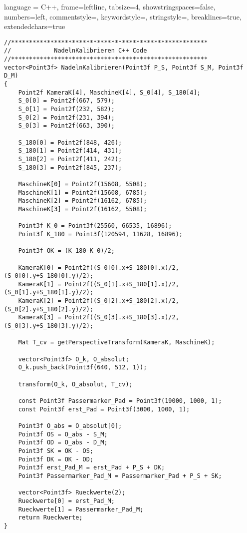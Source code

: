 \lstset
{
    language = C++,
    frame=leftline, %
    tabsize=4, %
    showstringspaces=false, %
    numbers=left, %
    commentstyle=\color{gray}, %
    keywordstyle=\color{red}, %
    stringstyle=\color{blue}, %
    breaklines=true,
    extendedchars=true
}
\begin{lstlisting}
//*******************************************************
//            NadelnKalibrieren C++ Code
//*******************************************************
vector<Point3f> NadelnKalibrieren(Point3f P_S, Point3f S_M, Point3f D_M)
{
    Point2f KameraK[4], MaschineK[4], S_0[4], S_180[4];
    S_0[0] = Point2f(667, 579);
    S_0[1] = Point2f(232, 582);
    S_0[2] = Point2f(231, 394);
    S_0[3] = Point2f(663, 390);

    S_180[0] = Point2f(848, 426);
    S_180[1] = Point2f(414, 431);
    S_180[2] = Point2f(411, 242);
    S_180[3] = Point2f(845, 237);

    MaschineK[0] = Point2f(15608, 5508);
    MaschineK[1] = Point2f(15608, 6785);
    MaschineK[2] = Point2f(16162, 6785);
    MaschineK[3] = Point2f(16162, 5508);

    Point3f K_0 = Point3f(25560, 66535, 16896);
    Point3f K_180 = Point3f(120594, 11628, 16896);

    Point3f OK = (K_180-K_0)/2;

    KameraK[0] = Point2f((S_0[0].x+S_180[0].x)/2, (S_0[0].y+S_180[0].y)/2);
    KameraK[1] = Point2f((S_0[1].x+S_180[1].x)/2, (S_0[1].y+S_180[1].y)/2);
    KameraK[2] = Point2f((S_0[2].x+S_180[2].x)/2, (S_0[2].y+S_180[2].y)/2);
    KameraK[3] = Point2f((S_0[3].x+S_180[3].x)/2, (S_0[3].y+S_180[3].y)/2);

    Mat T_cv = getPerspectiveTransform(KameraK, MaschineK);

    vector<Point3f> O_k, O_absolut;
    O_k.push_back(Point3f(640, 512, 1));

    transform(O_k, O_absolut, T_cv);

    const Point3f Passermarker_Pad = Point3f(19000, 1000, 1);
    const Point3f erst_Pad = Point3f(3000, 1000, 1);

    Point3f O_abs = O_absolut[0];
    Point3f OS = O_abs - S_M;
    Point3f OD = O_abs - D_M;
    Point3f SK = OK - OS;
    Point3f DK = OK - OD;
    Point3f erst_Pad_M = erst_Pad + P_S + DK;
    Point3f Passermarker_Pad_M = Passermarker_Pad + P_S + SK;

    vector<Point3f> Rueckwerte(2);
    Rueckwerte[0] = erst_Pad_M;
    Rueckwerte[1] = Passermarker_Pad_M;
    return Rueckwerte;
}
\end{lstlisting}
\clearpage

